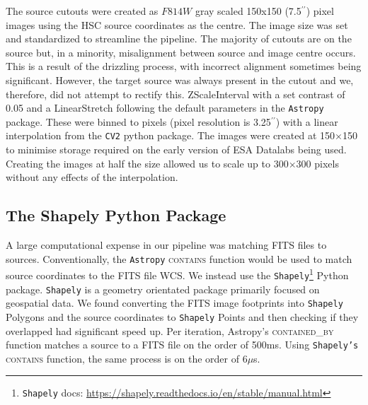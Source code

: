 The source cutouts were created as $F814W$ gray scaled 150x150 (7.5\DIFaddbegin {}\DIFaddend $^{\prime \prime}$\DIFdelbegin {}\DIFdelend ) pixel images using the HSC source coordinates as the centre. The image size was set and standardized to streamline the pipeline. The majority of cutouts are \DIFdelbegin {}\DIFdelend \DIFaddbegin {}\DIFaddend on the source but, in a minority, misalignment between source and image centre occurs. This is a result of the drizzling process, with incorrect alignment sometimes being significant. However, the target source was always present in the cutout and we, therefore, did not attempt to rectify this. \DIFdelbegin {}\DIFdelend \DIFaddbegin {}\DIFaddend ZScaleInterval with a \DIFdelbegin {}\DIFdelend set contrast of 0.05 and a LinearStretch following the default parameters in the \texttt{Astropy} \citep{astropy:2013, astropy:2018} package. These were binned to \DIFdelbegin {}\DIFdelend \DIFaddbegin {}\DIFaddend pixels (pixel resolution is 3.25\DIFaddbegin {}\DIFaddend $^{\prime \prime}$\DIFdelbegin {}\DIFdelend ) with a linear interpolation from the \texttt{CV2} python package. The images were created at 150$\times$150 to minimise storage required on the early version of ESA Datalabs being used. Creating the images at half the size allowed us to scale up to 300$\times$300 pixels without any effects of the interpolation.

\subsection{The Shapely Python Package}\label{benchmarks}
\noindent A large computational expense in our pipeline was matching FITS files to sources. Conventionally, the \texttt{Astropy} \textsc{contains} function would be used to match source coordinates to the FITS file WCS. We instead use the \texttt{Shapely}\footnote{\texttt{Shapely} docs: \url{https://shapely.readthedocs.io/en/stable/manual.html}} Python package.  \texttt{Shapely} is a geometry orientated package primarily focused on geospatial data. We found converting the FITS image footprints into \texttt{Shapely} Polygons and the source coordinates to \texttt{Shapely} Points and then checking if they overlapped had significant speed up. Per iteration, Astropy's \textsc{contained\_by} function matches a source to a FITS file on the order of 500ms. Using \texttt{Shapely's} \textsc{contains} function, the same process is on the order of 6$\mu$s.



